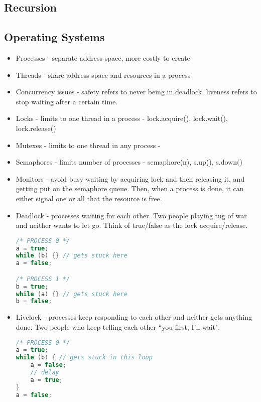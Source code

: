 \documentclass[10pt]{article}
\begin{document}
\subsection{Recursion}

\subsection{Operating Systems}
\begin{itemize}
    \item Processes - separate address space, more costly to create
    \item Threads - share address space and resources in a process
    \item Concurrency issues - safety refers to never being in deadlock, liveness refers to stop waiting after a certain time.
    \item Locks - limits to one thread in a process - lock.acquire(), lock.wait(), lock.release()
    \item Mutexes - limits to one thread in any process - 
    \item Semaphores - limits number of processes - semaphore(n), s.up(), s.down()
    \item Monitors - avoid busy waiting by acquiring lock and then releasing it, and getting put on the semaphore queue. Then, when a process is done, it can either signal one or all that the resource is free.
    \item Deadlock - processes waiting for each other. Two people playing tug of war and neither wants to let go. Think of true/false as the lock acquire/release.
    \begin{lstlisting}[language=c]
/* PROCESS 0 */
a = true; 
while (b) {} // gets stuck here
a = false; 

/* PROCESS 1 */
b = true;
while (a) {} // gets stuck here
b = false;
    \end{lstlisting}
    \item Livelock - processes keep responding to each other and neither gets anything done. Two people who keep telling each other ``you first, I'll wait".
\begin{lstlisting}[language=c]
/* PROCESS 0 */
a = true; 
while (b) { // gets stuck in this loop
    a = false;
    // delay
    a = true;
}
a = false; 


\end{lstlisting}
\end{itemize}
\end{document}
